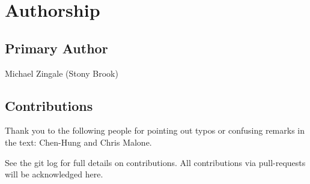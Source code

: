 \clearpage

\section*{Authorship}

\subsection*{Primary Author}

Michael Zingale (Stony Brook)


\subsection*{Contributions}

Thank you to the
following people for pointing out typos or confusing remarks in the text:
Chen-Hung and Chris Malone.

See the git log for full details on contributions.  All contributions
via pull-requests will be acknowledged here.
